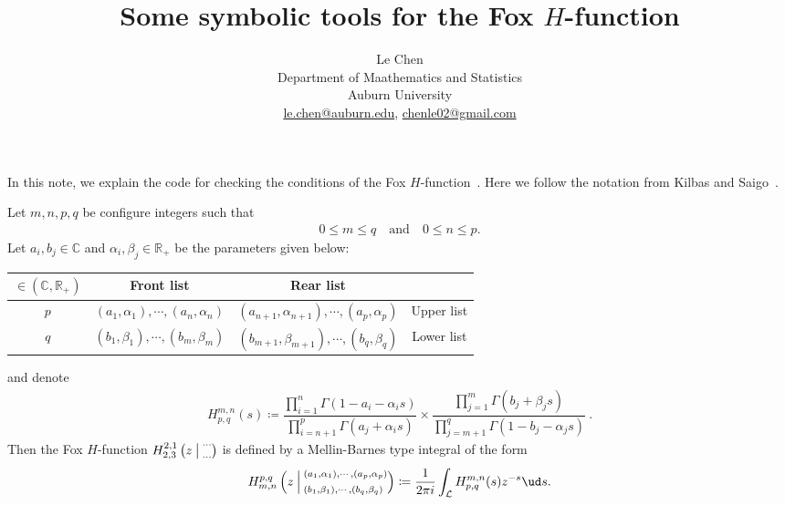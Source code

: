 \documentclass[12pt]{article} %
\newcommand{\R}{\mathbb{R}}
\newcommand{\FoxH}[5]{H_{#2}^{#1}\left(#3\:\middle\vert\: \begin{subarray}{l}#4\\[0.4em] #5\end{subarray}\right)}
\begin{document}
\title{Some symbolic tools for the {F}ox {$H$}-function}
\author{Le Chen                             \\
  Department of Maathematics and Statistics \\
  Auburn University                         \\
\url{le.chen@auburn.edu}, \url{chenle02@gmail.com}
}

\maketitle

In this note, we explain the code for checking the conditions of the Fox
$H$-function~\cite{fox:61:g}. Here we follow the notation from Kilbas and
Saigo~\cite{kilbas.saigo:04:h-transforms}.


Let $m,n,p,q$ be configure integers such that
\begin{align*}
  0 \le m \le q \quad \text{and} \quad
  0 \le n \le p.
\end{align*}
Let $a_i,b_j\in \mathbb{C}$ and $\alpha_i, \beta_j \in\R_+$ be the parameters given below:
\begin{center}
\renewcommand{\arraystretch}{1.2}
  \begin{tabular}{|c|cc|c|}
    \hline
    $\in \left(\mathbb{C},\R_+\right)$ & Front list                              & Rear list                                       &            \\ \hline
    $p$                                & $(a_1,\alpha_1),\cdots, (a_n,\alpha_n)$ & $(a_{n+1},\alpha_{n+1}),\cdots, (a_p,\alpha_p)$ & Upper list \\
    $q$                                & $(b_1,\beta_1),\cdots, (b_m,\beta_m)$   & $(b_{m+1},\beta_{m+1}),\cdots, (b_q,\beta_q)$   & Lower list \\ \hline
  \end{tabular}
\end{center}
and denote
\begin{align*}
  H^{m,n}_{p,q}(s) \coloneqq
         \dfrac{ \displaystyle \prod_{i=1}^n\Gamma\left(1-a_i-\alpha_is\right) }{ \displaystyle \prod_{i=n+1}^p\Gamma\left(a_j+\alpha_is\right)    }
  \times \dfrac{ \displaystyle \prod_{j=1}^m\Gamma\left(b_j+\beta_js\right)    }{ \displaystyle \prod_{j=m+1}^q\Gamma\left(1- b_j-\alpha_js\right) }\:.
\end{align*}
Then the Fox $H$-function $\FoxH{2,1}{2,3}{z}{\cdots}{\cdots}$ is defined by a Mellin-Barnes type integral of the form
\begin{align*}
  \FoxH{p,q}{m,n}{z}{(a_1,\alpha_1),\cdots, (a_p,\alpha_p)}{(b_1,\beta_1),\cdots, (b_q,\beta_q)}
  \coloneqq \frac{1}{2\pi i} \int_{\mathcal{L}} H^{m,n}_{p,q}(s) z^{-s} \ud s.
\end{align*}
\end{document}
